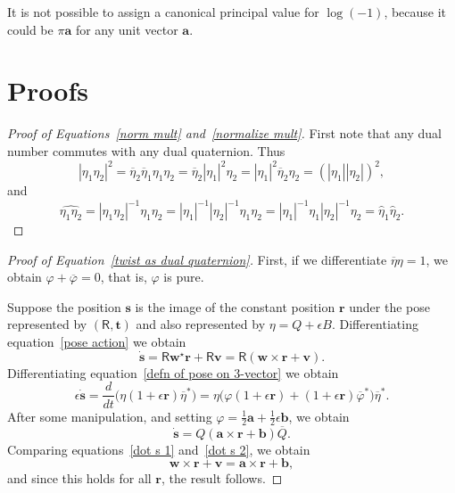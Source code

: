 \documentclass[reqno,12pt]{amsart}
\newcommand\starop[1]{#1^\star}
\begin{document}
It is not possible to assign a canonical principal value for $\log(-1)$, because it could be $\pi \bm a$ for any unit vector $\bm a$.

\section{Proofs}
\label{sec proofs}

\begin{proof}[Proof of Equations~\eqref{norm mult} and~\eqref{normalize mult}]
First note that any dual number commutes with any dual quaternion.  Thus
\begin{equation}
|\eta_1 \eta_2|^2 = \overline\eta_2 \overline\eta_1 \eta_1 \eta_2 = \overline\eta_2 |\eta_1|^2 \eta_2 = |\eta_1|^2 \overline\eta_2 \eta_2 = (|\eta_1| |\eta_2|)^2 ,
\end{equation}
and
\begin{equation}
\widehat{\eta_1 \eta_2}
= |\eta_1 \eta_2|^{-1} \eta_1 \eta_2
= |\eta_1|^{-1} | \eta_2|^{-1} \eta_1 \eta_2
= |\eta_1|^{-1} \eta_1 | \eta_2|^{-1} \eta_2
= \widehat\eta_1 \widehat\eta_2.
\end{equation}

\end{proof}

\begin{proof}[Proof of Equation~\eqref{twist as dual quaternion}]
First, if we differentiate $\overline\eta \eta = 1$, we obtain $\varphi + \overline \varphi = 0$, that is, $\varphi$ is pure.

Suppose the position $\bm s$ is the image of the constant position $\bm r$ under the pose represented by $(\mathsf R, \bm t)$ and also represented by $\eta = Q + \epsilon B$.  Differentiating equation~\eqref{pose action} we obtain
\begin{equation}
\label{dot s 1}
\dot{\bm s} = \mathsf R \starop{\bm w} \bm r + \mathsf R \bm v = \mathsf R(\bm w \times \bm r + \bm v ).
\end{equation}
Differentiating equation~\eqref{defn of pose on 3-vector} we obtain
\begin{equation}
\epsilon \dot{\bm s}
= \frac d{dt}\bigl(\eta(1+\epsilon \bm r)\overline \eta^*\bigr)
= \eta\bigl(\varphi(1+\epsilon \bm r) + (1+\epsilon\bm r)\overline{\varphi}^*\bigr)\overline \eta^* .
\end{equation}
After some manipulation, and setting $\varphi = \tfrac12\bm a + \tfrac12\epsilon \bm b$, we obtain
\begin{equation}
\label{dot s 2}
\dot{\bm s} = Q(\bm a \times \bm r + \bm b)\overline Q .
\end{equation}
Comparing equations~\eqref{dot s 1} and~\eqref{dot s 2}, we obtain
\begin{equation}
\bm w \times \bm r + \bm v = \bm a \times \bm r + \bm b,
\end{equation}
and since this holds for all $\bm r$, the result follows.
\end{proof}
\end{document}
